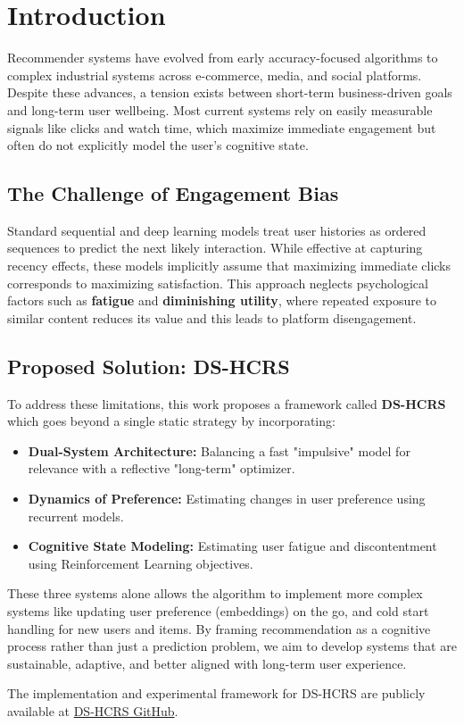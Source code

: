 \section{Introduction}

Recommender systems have evolved from early accuracy-focused algorithms 
to complex industrial systems across e-commerce, media, and social platforms.
Despite these advances, a tension exists between short-term business-driven goals and long-term user wellbeing.
Most current systems rely on easily measurable signals like clicks and watch time, 
which maximize immediate engagement but often do not explicitly model the user's cognitive state.

\subsection*{The Challenge of Engagement Bias}

Standard sequential and deep learning models treat user histories as ordered sequences to predict the next likely interaction.
While effective at capturing recency effects, these models implicitly assume that maximizing immediate clicks corresponds to maximizing satisfaction.
This approach neglects psychological factors such as \textbf{fatigue} and \textbf{diminishing utility}, 
where repeated exposure to similar content reduces its value and this leads to platform disengagement.

\subsection*{Proposed Solution: DS-HCRS}

To address these limitations, this work proposes a framework called \textbf{DS-HCRS} 
which goes beyond a single static strategy by incorporating:

\begin{itemize}
    \item \textbf{Dual-System Architecture:} Balancing a fast "impulsive" model for relevance with a reflective "long-term" optimizer.
    \item \textbf{Dynamics of Preference:} Estimating changes in user preference using recurrent models.
    \item \textbf{Cognitive State Modeling:} Estimating user fatigue and discontentment using Reinforcement Learning objectives.
\end{itemize}

These three systems alone allows the algorithm to implement more complex systems like 
updating user preference (embeddings) on the go, and cold start handling for new users and items.
By framing recommendation as a cognitive process rather than just a prediction problem,
we aim to develop systems that are sustainable, adaptive, and better aligned with long-term user experience.

The implementation and experimental framework for DS-HCRS are publicly available at
\href{https://github.com/SHREYA-1103/RS-project}{DS-HCRS GitHub}.